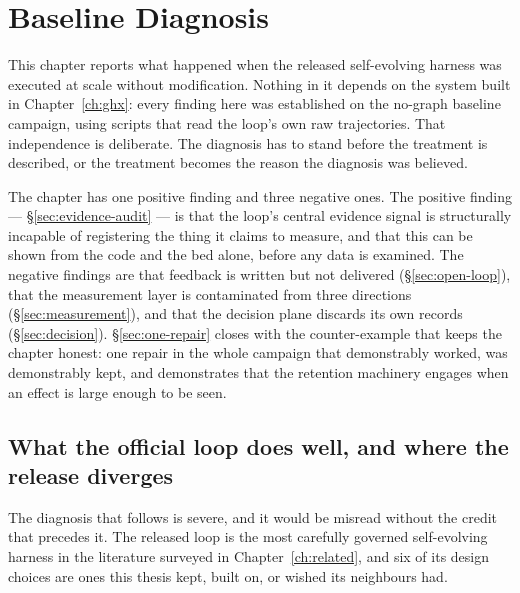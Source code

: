\chapter{Baseline Diagnosis}
\label{ch:baseline}


This chapter reports what happened when the released self-evolving harness
was executed at scale without modification. Nothing in it depends on the
system built in Chapter~\ref{ch:ghx}: every finding here was established on
the no-graph baseline campaign, using scripts that read the loop's own raw
trajectories. That independence is deliberate. The diagnosis has to stand
before the treatment is described, or the treatment becomes the reason the
diagnosis was believed.

The chapter has one positive finding and three negative ones. The positive
finding --- \S\ref{sec:evidence-audit} --- is that the loop's central
evidence signal is structurally incapable of registering the thing it
claims to measure, and that this can be shown from the code and the bed
alone, before any data is examined. The negative findings are that feedback
is written but not delivered (\S\ref{sec:open-loop}), that the measurement
layer is contaminated from three directions (\S\ref{sec:measurement}), and
that the decision plane discards its own records (\S\ref{sec:decision}).
\S\ref{sec:one-repair} closes with the counter-example that keeps the
chapter honest: one repair in the whole campaign that demonstrably worked,
was demonstrably kept, and demonstrates that the retention machinery
engages when an effect is large enough to be seen.

\section{What the official loop does well, and where the release diverges}
\label{sec:official-strengths}

The diagnosis that follows is severe, and it would be misread without the
credit that precedes it. The released loop is the most carefully governed
self-evolving harness in the literature surveyed in Chapter~\ref{ch:related},
and six of its design choices are ones this thesis kept, built on, or
wished its neighbours had.

